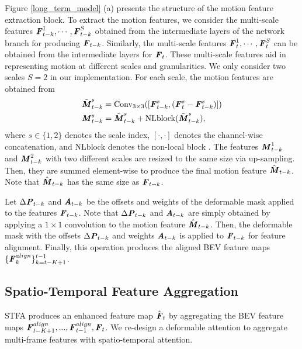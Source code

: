 \documentclass[letterpaper]{article} \usepackage{aaai23}  \usepackage{times}  \usepackage{helvet}  \usepackage{courier}  \usepackage[hyphens]{url}  \usepackage{graphicx} \urlstyle{rm} \def\UrlFont{\rm}  \usepackage{natbib}  \usepackage{caption} \frenchspacing  \setlength{\pdfpagewidth}{8.5in} \usepackage{algorithm}
\begin{document}
Figure \ref{long_term_model} (a) presents the structure of the motion feature extraction block.
To extract the motion features, we consider the multi-scale features $\textbf{\textit{F}}_{t-k}^{1}, \cdots, \textbf{\textit{F}}_{t-k}^{S}$ obtained from the intermediate  layers of the network branch for producing $\textbf{\textit{F}}_{t-k}$. Similarly, 
the multi-scale features $\textbf{\textit{F}}_{t}^{1}, \cdots, \textbf{\textit{F}}_{t}^{S}$ can be obtained from the intermediate layers for $\textbf{\textit{F}}_{t}$. These multi-scale features aid in representing motion at different scales and granularities. We only consider two scales $S=2$ in our implementation. For each scale, the motion features are obtained from 
\begin{align}
    \tilde{\textbf{\textit{M}}}^s_{t-k} &= \mathrm{Conv}_{3\times3}([\textbf{\textit{F}}^{s}_{t-k}, (\textbf{\textit{F}}^{s}_{t}-\textbf{\textit{F}}^{s}_{t-k})]) \\    
    \textbf{\textit{M}}^s_{t-k} &= \tilde{\textbf{\textit{M}}}^s_{t-k} + \mathrm{NLblock}(\tilde{\textbf{\textit{M}}}^s_{t-k}), 
\end{align}
 where $s \in \{1,2\}$ denotes the scale index, $[\cdot,\cdot]$ denotes the channel-wise concatenation, and  $\mathrm{NLblock}$ denotes the non-local block \cite{nonlocal}. The features $\textbf{\textit{M}}^1_{t-k}$ and $\textbf{\textit{M}}^2_{t-k}$ with two different scales are resized to the same size via up-sampling. Then, they are summed element-wise to produce the final motion feature $\hat{\textbf{\textit{M}}}_{t-k}$. Note that  $\hat{\textbf{\textit{M}}}_{t-k}$ has the same size as $\textbf{\textit{F}}_{t-k}$.  
 
 
 Let  $\Delta \textbf{\textit{P}}_{t-k}$ and  $\textbf{\textit{A}}_{t-k}$ be the offsets and weights of the deformable mask applied to the features $\textbf{\textit{F}}_{t-k}$. Note that $\Delta \textbf{\textit{P}}_{t-k}$ and  $\textbf{\textit{A}}_{t-k}$ are simply obtained by applying a $1 \times 1$ convolution to the motion feature $\hat{\textbf{\textit{M}}}_{t-k}$. Then, the deformable mask with the offsets $\Delta \textbf{\textit{P}}_{t-k}$ and weights $\textbf{\textit{A}}_{t-k}$ is applied to $\textbf{\textit{F}}_{t-k}$ for feature alignment. Finally, this operation produces the aligned BEV feature maps $\{\textbf{\textit{F}}_{k}^{align}\}_{k=t-K+1}^{t-1}$.

\subsection{Spatio-Temporal Feature Aggregation}
STFA produces an enhanced feature map $\hat{\textbf{\textit{F}}}_t$ by aggregating the BEV feature maps $ \textbf{\textit{F}}_{t-K+1}^{align},...,\textbf{\textit{F}}_{t-1}^{align}, \textbf{\textit{F}}_{t}$. We re-design a deformable attention \cite{def-detr} to aggregate multi-frame features with spatio-temporal attention. 
\end{document}

